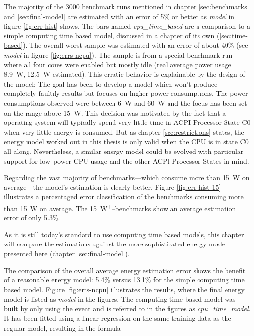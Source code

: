 The majority of the 3000 benchmark runs mentioned in chapter
\ref{sec:benchmarks} and \ref{sec:final-model} are estimated with an error of
5\% or better as \emph{model} in figure \ref{fig:err-hist} shows. The bars named
\emph{cpu\_\-time\_\-based} are a comparison to a simple computing time based
model, discussed in a chapter of its own (\ref{sec:time-based}). The overall
worst sample was estimated with an error of about 40\% (see \emph{model} in
figure \ref{fig:errs-ncpu}). The sample is from a special benchmark run where
all four cores were enabled but mostly idle (real average power usage
\SI{8.9}{\watt}, \SI{12.5}{\watt} estimated). This erratic behavior is
explainable by the design of the model: The goal has been to develop a model
which won't produce completely faultily results but focuses on higher power
consumptions. The power consumptions observed were between \SI{6}{\watt} and
\SI{60}{\watt} and the focus has been set on the range above \SI{15}{\watt}.
This decision was motivated by the fact that a operating system will typically
spend very little time in ACPI Processor State C0 \cite{wiki:ACPI} when very
little energy is consumed. But as chapter \ref{sec:restrictions} states, the
energy model worked out in this thesis is only valid when the CPU is in state C0
all along.  Nevertheless, a similar energy model could be evolved with
particular support for low--power CPU usage and the other ACPI Processor States
in mind.

Regarding the vast majority of benchmarks---which consume more than
\SI{15}{\watt} on average---the model's estimation is clearly better. Figure
\ref{fig:err-hist-15} illustrates a percentaged error classification of the
benchmarks consuming more than \SI{15}{\watt} on average. The
\SI{15}{\watt}\textsuperscript{+}--benchmarks show an average estimation error
of only 5.3\%.


\label{sec:time-based}

As it is still today's standard to use computing time based models, this chapter
will compare the estimations against the more sophisticated energy model
presented here (chapter \ref{sec:final-model}).

The comparison of the overall average energy estimation error shows the benefit
of a reasonable energy model: 5.4\% versus 13.1\% for the simple computing time
based model. Figure \ref{fig:errs-ncpu} illustrates the results, where the final
energy model is listed as \emph{model} in the figures. The computing time based
model was built by only using the event  and is
referred to in the figures as \emph{cpu\_\-time\_\-model}. It has been fitted
using a linear regression on the same training data as the regular model,
resulting in the formula

